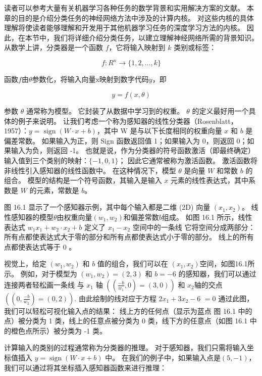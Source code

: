 读者可以参考大量有关机器学习各种任务的数学背景和实用解决方案的文献。 本章的目的是介绍分类任务的神经网络方法中涉及的计算内核。 对这些内核的具体理解将使读者能够理解和开发用于其他机器学习任务的深度学习方法的内核。 因此，在本节中，我们将详细介绍分类任务，以建立理解神经网络所需的背景知识。 从数学上讲，分类器是一个函数 $f$，它将输入映射到 $k$ 类别或标签：

$$
f: R^{n} \rightarrow\{1,2, \ldots, k\}
$$

函数$f$由$\theta$参数化，将输入向量$\mathrm{x}$映射到数字代码$y$，即

$$
y=f(x, θ)
$$

参数 $\theta$ 通常称为模型。 它封装了从数据中学习到的权重。 $\theta$ 的定义最好用一个具体的例子来说明。 让我们考虑一个称为感知器的线性分类器（Rosenblatt，1957）：$y=\operatorname{sign}(W \cdot x+b)$，其中 $\mathrm{W}$ 是与以下长度相同的权重向量 $x$ 和 $b$ 是偏差常数。 如果输入为正，则 Sign 函数返回值 1；如果输入为 0，则返回 0；如果输入为负，则返回 -1。 也就是说，作为分类器的符号函数激活（即最终确定）输入值到三个类别的映射：$\{-1,0,1\}$； 因此它通常被称为激活函数。 激活函数将非线性引入感知器的线性函数中。 在这种情况下，模型 $\theta$ 是向量 $W$ 和常数 $b$ 的组合。 模型的结构是一个符号函数，其输入是输入 $x$ 元素的线性表达式，其中系数是 $W$ 的元素，常数是 $b$。

图 16.1 显示了一个感知器示例，其中每个输入都是二维 (2D) 向量 $\left(x_{1}, x_{2}\right)$。 线性感知器的模型$\theta$由权重向量$\left(w_{1}, w_{2}\right)$和偏差常数$b$组成。 如图 16.1 所示，线性表达式 $w_{1} x_{1}+w_{2} \cdot x_{2}+b$ 定义了 $x_{1}-x_{2}$ 空间中的一条线 它将空间分成两部分：所有点都使表达式大于零的部分和所有点都使表达式小于零的部分。 线上的所有点都使表达式等于 0 。

视觉上，给定 $\left(w_{1}, w_{2}\right)$ 和 $b$ 值的组合，我们可以在 $\left(x_{1}, x_{2}\right)$空间，如图16.1所示。 例如，对于模型为 $\left(w_{1}, w_{2}\right)=(2,3)$ 和 $b=-6$ 的感知器，我们可以通过连接两者轻松画一条线 与 $x_{1}$ 轴 $\left(\left(\frac{-b}{w_{1}}, 0\right)=(3,0)\right)$ 和 $x_{2}$轴的交点$\left(\left(0, \frac{-b}{w_{2}}\right)=(0,2)\right)$. 由此绘制的线对应于方程 $2 x_{1}+3 x_{2}-6$ $=0$ 通过此图，我们可以轻松可视化输入点的结果： 线上方的任何点（显示为蓝点 图 16.1 中的点）被分类为 1 类，线上的任意点被分类为 0 类，线下方的任意点（如图 16.1 中的橙色点所示）被分类为 -1 类。

计算输入的类别的过程通常称为分类器的推理。 对于感知器，我们只需将输入坐标值插入 $y=\operatorname{sign}(W \cdot x+b)$ 中。 在我们的例子中，如果输入点是$(5,-1)$，我们可以通过将其坐标插入感知器函数来进行推理：

